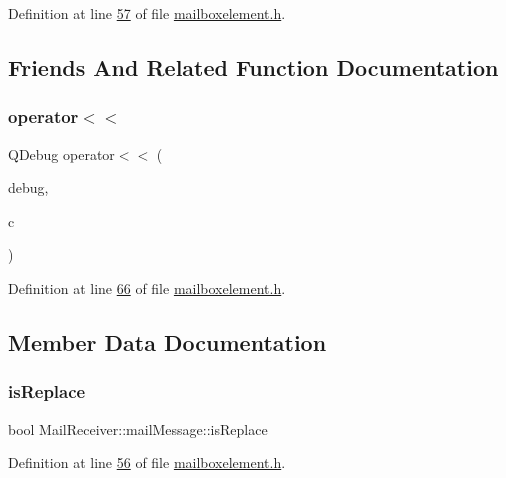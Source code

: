 Definition at line \hyperlink{a00002_source_l00057}{57} of file \hyperlink{a00002_source}{mailboxelement.\+h}.



\subsection{Friends And Related Function Documentation}
\mbox{\label{a00201_a5082ba525e6289ae6fc923e40c68192f}} 
\subsubsection{\texorpdfstring{operator$<$$<$}{operator<<}}
{\footnotesize\ttfamily Q\+Debug operator$<$$<$ (\begin{DoxyParamCaption}\item[{Q\+Debug}]{debug,  }\item[{const \hyperlink{a00201}{mail\+Message} \&}]{c }\end{DoxyParamCaption})\hspace{0.3cm}{\ttfamily [friend]}}



Definition at line \hyperlink{a00002_source_l00066}{66} of file \hyperlink{a00002_source}{mailboxelement.\+h}.



\subsection{Member Data Documentation}
\mbox{\label{a00201_afb7ab5377a6aa4a1e3d836d3e464a952}} 
\subsubsection{\texorpdfstring{is\+Replace}{isReplace}}
{\footnotesize\ttfamily bool Mail\+Receiver\+::mail\+Message\+::is\+Replace}



Definition at line \hyperlink{a00002_source_l00056}{56} of file \hyperlink{a00002_source}{mailboxelement.\+h}.

